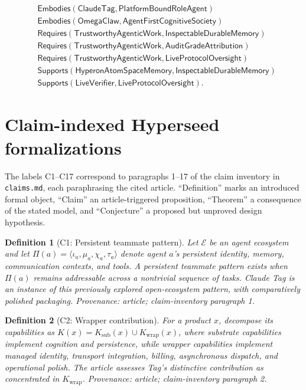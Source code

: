 \documentclass[11pt,a4paper]{article}
\newtheorem{definition}{Definition}[section]
\begin{document}
\[
\begin{aligned}
&\mathsf{Embodies}(\mathsf{ClaudeTag}, \mathsf{PlatformBoundRoleAgent}) \\
&\mathsf{Embodies}(\mathsf{OmegaClaw}, \mathsf{AgentFirstCognitiveSociety}) \\
&\mathsf{Requires}(\mathsf{TrustworthyAgenticWork}, \mathsf{InspectableDurableMemory}) \\
&\mathsf{Requires}(\mathsf{TrustworthyAgenticWork}, \mathsf{AuditGradeAttribution}) \\
&\mathsf{Requires}(\mathsf{TrustworthyAgenticWork}, \mathsf{LiveProtocolOversight}) \\
&\mathsf{Supports}(\mathsf{HyperonAtomSpaceMemory}, \mathsf{InspectableDurableMemory}) \\
&\mathsf{Supports}(\mathsf{LiveVerifier}, \mathsf{LiveProtocolOversight}).
\end{aligned}
\]

\section{Claim-indexed Hyperseed formalizations}
The labels C1--C17 correspond to paragraphs 1--17 of the claim inventory in
\texttt{claims.md}, each paraphrasing the cited article.  ``Definition'' marks
an introduced formal object, ``Claim'' an article-triggered proposition,
``Theorem'' a consequence of the stated model, and ``Conjecture'' a proposed
but unproved design hypothesis.

\begin{definition}[C1: Persistent teammate pattern]
Let $\mathcal{E}$ be an agent ecosystem and let
$\Pi(a)=\langle\iota_a,\mu_a,\chi_a,\tau_a\rangle$ denote agent $a$'s
persistent identity, memory, communication contexts, and tools.  A
\emph{persistent teammate pattern} exists when $\Pi(a)$ remains addressable
across a nontrivial sequence of tasks.  Claude Tag is an instance of this
previously explored open-ecosystem pattern, with comparatively polished
packaging.  \emph{Provenance: article; claim-inventory paragraph 1.}
\end{definition}

\begin{definition}[C2: Wrapper contribution]
For a product $x$, decompose its capabilities as
$K(x)=K_{\mathrm{sub}}(x)\cup K_{\mathrm{wrap}}(x)$, where substrate
capabilities implement cognition and persistence, while wrapper capabilities
implement managed identity, transport integration, billing, asynchronous
dispatch, and operational polish.  The article assesses Tag's distinctive
contribution as concentrated in $K_{\mathrm{wrap}}$.
\emph{Provenance: article; claim-inventory paragraph 2.}
\end{definition}
\end{document}
